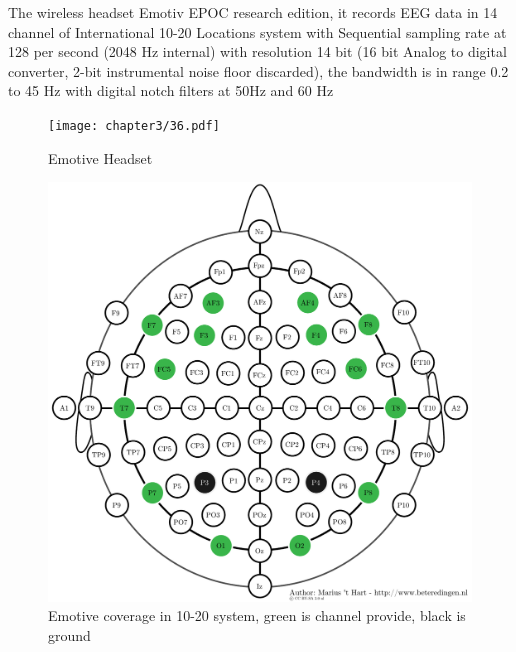 \hspace{1.5cm} The wireless headset Emotiv EPOC research edition, it records EEG data in 14 channel of International 10-20 Locations system with Sequential sampling rate at 128 per second (2048 Hz internal) with resolution 14 bit (16 bit Analog to digital converter, 2-bit instrumental noise floor discarded), the bandwidth is in range 0.2 to 45 Hz with digital notch filters at 50Hz and 60 Hz

\begin{figure}[ht]
	\centering
	\texttt{[image: chapter3/36.pdf]}
	\caption{Emotive Headset}
\end{figure}

\begin{figure}[ht]
	\centering
	\includegraphics[scale = 0.5]{chapter3/emotiv_electrodes_cover.pdf}
	\caption{Emotive coverage in 10-20 system, green is channel provide, black is ground}
\end{figure}

